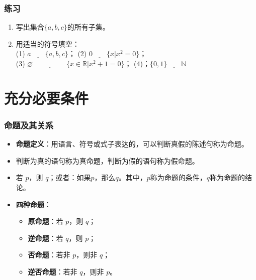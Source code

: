 \documentclass[aspectratio=169]{ctexbeamer} %
\begin{document}
\begin{frame}
\frametitle{练习}
\begin{enumerate}[label={\arabic*.}]
\item 写出集合\(\{a, b, c\}\)的所有子集。
\item 用适当的符号填空：\\
(1) $a \underline{\hspace{2em}} \{a, b, c\}$；\hspace{3cm} (2) $0 \underline{\hspace{2em}} \{ x | x^2 = 0 \}$；\\
(3) $\varnothing \underline{\hspace{2cm}} \{ x \in \mathbb{R} | x^2 + 1 = 0 \} $；\hspace{3cm} (4)；$\{0, 1\} \underline{\hspace{2em}} \mathbb{N}$
\end{enumerate}
\end{frame}

\section{充分必要条件}
\begin{frame}
\frametitle{命题及其关系}
\begin{itemize}
\item \textbf{命题定义}：用语言、符号或式子表达的，可以判断真假的陈述句称为命题。
\item 判断为真的语句称为真命题，判断为假的语句称为假命题。
\item 若 \(p\)，则 \(q\)；或者：如果\(p\)，那么\(q\)。其中，\(p\)称为命题的条件，\(q\)称为命题的结论。
\item \textbf{四种命题}：
  \begin{itemize}
  \item \textbf{原命题}：若 \(p\)，则 \(q\)；
  \item \textbf{逆命题}：若 \(q\)，则 \(p\)；
  \item \textbf{否命题}：若非 \(p\)，则非 \(q\)；
  \item \textbf{逆否命题}：若非 \(q\)，则非 \(p\)。
  \end{itemize}
\end{itemize}
\end{frame}
\end{document}
